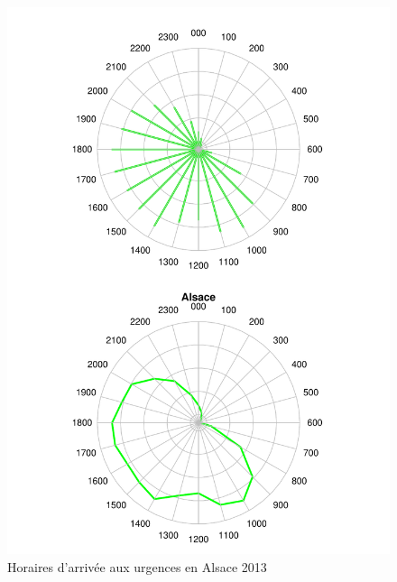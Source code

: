\documentclass[12pt,english,french,twoside]{book}\usepackage[]{graphicx}\usepackage[]{color}
\makeatletter
\def\maxwidth{ %
  \ifdim\Gin@nat@width>\linewidth
    \linewidth
  \else
    \Gin@nat@width
  \fi
}
\newenvironment{knitrout}{}{} %
\makeatother
\begin{document}
\begin{figure}
\begin{center}
\begin{knitrout}
\color{fgcolor}
\includegraphics[width=\maxwidth]{figure/test25} 

\end{knitrout}

\end{center}
\caption{Horaires d'arrivée aux urgences en Alsace 2013}
\label{radar:als}
\end{figure}
\end{document}
